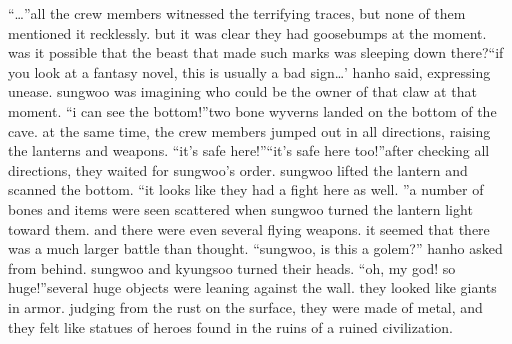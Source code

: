 “…”all the crew members witnessed the terrifying traces, but none of them mentioned it recklessly.
 but it was clear they had goosebumps at the moment.
was it possible that the beast that made such marks was sleeping down there?“if you look at a fantasy novel, this is usually a bad sign…’ hanho said, expressing unease.
sungwoo was imagining who could be the owner of that claw at that moment.
“i can see the bottom!”two bone wyverns landed on the bottom of the cave.
 at the same time, the crew members jumped out in all directions, raising the lanterns and weapons.
“it’s safe here!”“it’s safe here too!”after checking all directions, they waited for sungwoo’s order.
sungwoo lifted the lantern and scanned the bottom.
“it looks like they had a fight here as well.
”a number of bones and items were seen scattered when sungwoo turned the lantern light toward them.
 and there were even several flying weapons.
 it seemed that there was a much larger battle than thought.
“sungwoo, is this a golem?” hanho asked from behind.
sungwoo and kyungsoo turned their heads.
“oh, my god! so huge!”several huge objects were leaning against the wall.
 they looked like giants in armor.
judging from the rust on the surface, they were made of metal, and they felt like statues of heroes found in the ruins of a ruined civilization.


 
